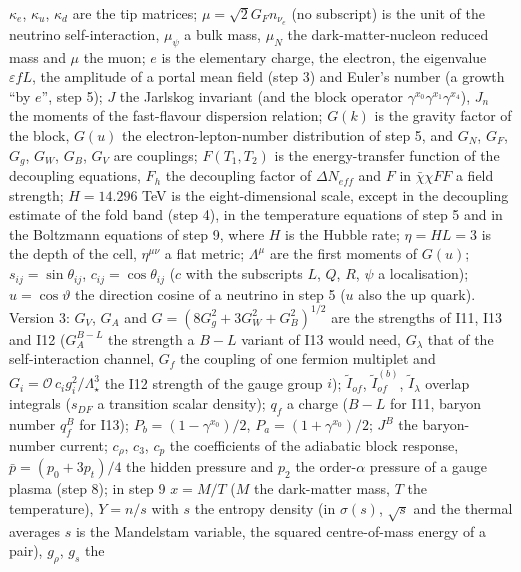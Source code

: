 \documentclass[
  10pt,
]{article}
\begin{document}
\(\kappa_e\), \(\kappa_u\), \(\kappa_d\) are the tip matrices;
\(\mu = \sqrt2G_Fn_{\nu_e}\) (no subscript) is the unit of the neutrino
self-interaction, \(\mu_\psi\) a bulk mass, \(\mu_N\) the
dark-matter-nucleon reduced mass and \(\mu\) the muon; \(e\) is the
elementary charge, the electron, the eigenvalue \(\varepsilon fL\), the
amplitude of a portal mean field (step 3) and Euler's number (a growth
``by \(e\)'', step 5); \(J\) the Jarlskog invariant (and the block
operator \(\gamma^{x_0}\gamma^{x_1}\gamma^{x_4}\)), \(J_n\) the moments
of the fast-flavour dispersion relation; \(G(k)\) is the gravity factor
of the block, \(G(u)\) the electron-lepton-number distribution of step
5, and \(G_N\), \(G_F\), \(G_g\), \(G_W\), \(G_B\), \(G_V\) are
couplings; \(F(T_1, T_2)\) is the energy-transfer function of the
decoupling equations, \(F_h\) the decoupling factor of
\(\Delta N_{eff}\) and \(F\) in \(\bar\chi\chi FF\) a field strength;
\(H = 14.296\) TeV is the eight-dimensional scale, except in the
decoupling estimate of the fold band (step 4), in the temperature
equations of step 5 and in the Boltzmann equations of step 9, where
\(H\) is the Hubble rate; \(\eta = HL = 3\) is the depth of the cell,
\(\eta^{\mu\nu}\) a flat metric; \(\Lambda^\mu\) are the first moments
of \(G(u)\); \(s_{ij} = \sin\theta_{ij}\), \(c_{ij} = \cos\theta_{ij}\)
(\(c\) with the subscripts \(L\), \(Q\), \(R\), \(\psi\) a
localisation); \(u = \cos\vartheta\) the direction cosine of a neutrino
in step 5 (\(u\) also the up quark). Version 3: \(G_V\), \(G_A\) and
\(G = (8G_g^2 + 3G_W^2 + G_B^2)^{1/2}\) are the strengths of I11, I13
and I12 (\(G_A^{B-L}\) the strength a \(B - L\) variant of I13 would
need, \(G_\lambda\) that of the self-interaction channel, \(G_f\) the
coupling of one fermion multiplet and
\(G_i = \mathcal O\,c_ig_i^2/\Lambda_\star^3\) the I12 strength of the
gauge group \(i\)); \(\tilde I_{of}\), \(\tilde I^{(b)}_{of}\),
\(\tilde I_\lambda\) overlap integrals (\(s_{DF}\) a transition scalar
density); \(q_f\) a charge (\(B - L\) for I11, baryon number \(q^B_f\)
for I13); \(P_b = (1 - \gamma^{x_0})/2\),
\(P_a = (1 + \gamma^{x_0})/2\); \(J^B\) the baryon-number current;
\(c_\rho\), \(c_3\), \(c_p\) the coefficients of the adiabatic block
response, \(\bar p = (p_0 + 3p_t)/4\) the hidden pressure and \(p_2\)
the order-\(\alpha\) pressure of a gauge plasma (step 8); in step 9
\(x = M/T\) (\(M\) the dark-matter mass, \(T\) the temperature),
\(Y = n/s\) with \(s\) the entropy density (in \(\sigma(s)\),
\(\sqrt s\) and the thermal averages \(s\) is the Mandelstam variable,
the squared centre-of-mass energy of a pair), \(g_\rho\), \(g_s\) the
\end{document}
